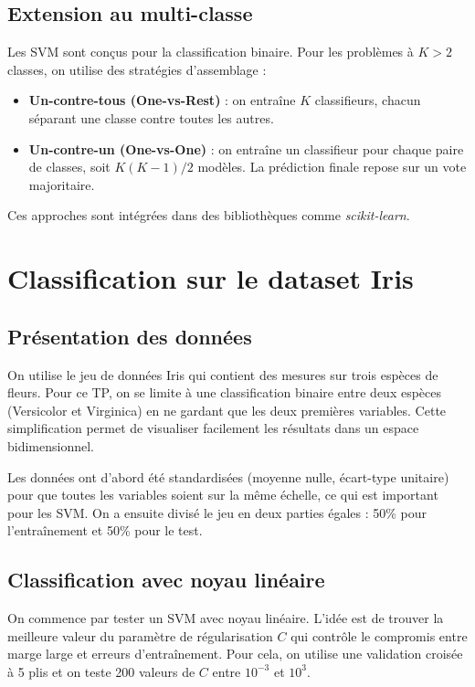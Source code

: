 \documentclass[11pt,a4paper]{article}
\begin{document}
\subsection{Extension au multi-classe}
Les SVM sont conçus pour la classification binaire. Pour les problèmes à $K > 2$ classes, on utilise des stratégies d’assemblage :
\begin{itemize}
    \item \textbf{Un-contre-tous (One-vs-Rest)} : on entraîne $K$ classifieurs, chacun séparant une classe contre toutes les autres.
    \item \textbf{Un-contre-un (One-vs-One)} : on entraîne un classifieur pour chaque paire de classes, soit $K(K-1)/2$ modèles.
    La prédiction finale repose sur un vote majoritaire.
\end{itemize}

Ces approches sont intégrées dans des bibliothèques comme \textit{scikit-learn}.


\section{Classification sur le dataset Iris}

\subsection{Présentation des données}

On utilise le jeu de données Iris qui contient des mesures sur trois espèces de fleurs. Pour ce TP, on se limite à une classification binaire entre deux espèces (Versicolor et Virginica) en ne gardant que les deux premières variables. Cette simplification permet de visualiser facilement les résultats dans un espace bidimensionnel.

Les données ont d'abord été standardisées (moyenne nulle, écart-type unitaire) pour que toutes les variables soient sur la même échelle, ce qui est important pour les SVM. On a ensuite divisé le jeu en deux parties égales : 50\% pour l'entraînement et 50\% pour le test.

\subsection{Classification avec noyau linéaire}

On commence par tester un SVM avec noyau linéaire. L'idée est de trouver la meilleure valeur du paramètre de régularisation $C$ qui contrôle le compromis entre marge large et erreurs d'entraînement. Pour cela, on utilise une validation croisée à 5 plis et on teste 200 valeurs de $C$ entre $10^{-3}$ et $10^3$.
\end{document}

